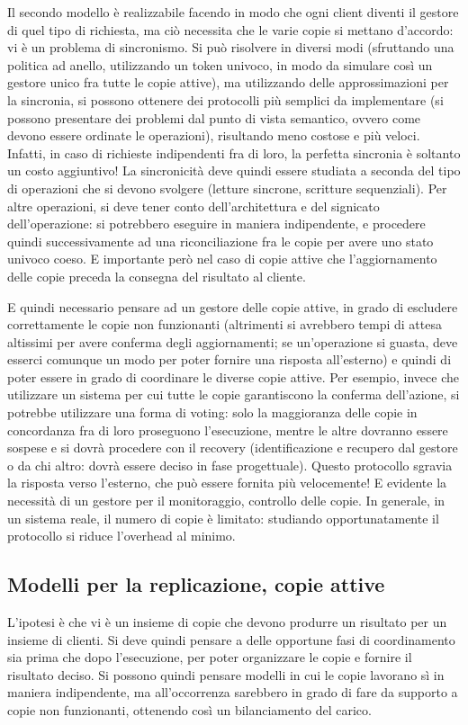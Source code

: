 Il secondo modello è realizzabile facendo in modo che ogni client diventi il 
gestore di quel tipo di richiesta, ma
ciò necessita che le varie copie si mettano d'accordo: vi è un problema di 
sincronismo. Si può risolvere in diversi
modi (sfruttando una politica ad anello, utilizzando un token univoco, in modo 
da simulare così un gestore unico fra
tutte le copie attive), ma utilizzando delle approssimazioni per la sincronia, 
si possono ottenere dei protocolli più
semplici da implementare (si possono presentare dei problemi dal punto di vista 
semantico, ovvero come devono essere
ordinate le operazioni), risultando meno costose e più veloci. Infatti, in caso 
di richieste indipendenti fra di loro,
la perfetta sincronia è soltanto un costo aggiuntivo! La sincronicità deve 
quindi essere studiata a seconda del tipo di
operazioni che si devono svolgere (letture sincrone, scritture sequenziali). 
Per altre operazioni, si deve tener conto
dell'architettura e del signicato dell'operazione: si potrebbero eseguire in 
maniera indipendente, e procedere quindi
successivamente ad una riconciliazione fra le copie per avere uno stato univoco 
coeso. E importante però nel caso di
copie attive che l'aggiornamento delle copie preceda la consegna del risultato 
al cliente.

E quindi necessario pensare ad un gestore delle copie attive, in grado di 
escludere correttamente le copie non
funzionanti (altrimenti si avrebbero tempi di attesa altissimi per avere 
conferma degli aggiornamenti; se un'operazione
si guasta, deve esserci comunque un modo per poter fornire una risposta 
all'esterno) e quindi di poter essere in grado
di coordinare le diverse copie attive. Per esempio, invece che utilizzare un 
sistema per cui tutte le copie garantiscono
la conferma dell'azione, si potrebbe utilizzare una forma di voting: solo la 
maggioranza delle copie in concordanza fra
di loro proseguono l'esecuzione, mentre le altre dovranno essere sospese e si 
dovrà procedere con il recovery
(identificazione e recupero dal gestore o da chi altro: dovrà essere deciso in 
fase progettuale).
Questo protocollo sgravia la risposta verso l'esterno, che può essere fornita 
più velocemente! E evidente la necessità
di un gestore per il monitoraggio, controllo delle copie. In generale, in un 
sistema reale, il numero di copie è
limitato: studiando opportunatamente il protocollo si riduce l'overhead al 
minimo.
\subsection{Modelli per la replicazione, copie attive}
L'ipotesi è che vi è un insieme di copie che devono produrre un risultato per 
un insieme di clienti. Si deve quindi
pensare a delle opportune fasi di coordinamento sia prima che dopo 
l'esecuzione, per poter organizzare le copie e
fornire il risultato deciso. Si possono quindi pensare modelli in cui le copie 
lavorano sì in maniera indipendente,
ma all'occorrenza sarebbero in grado di fare da supporto a copie non 
funzionanti, ottenendo così un bilanciamento del
carico.

